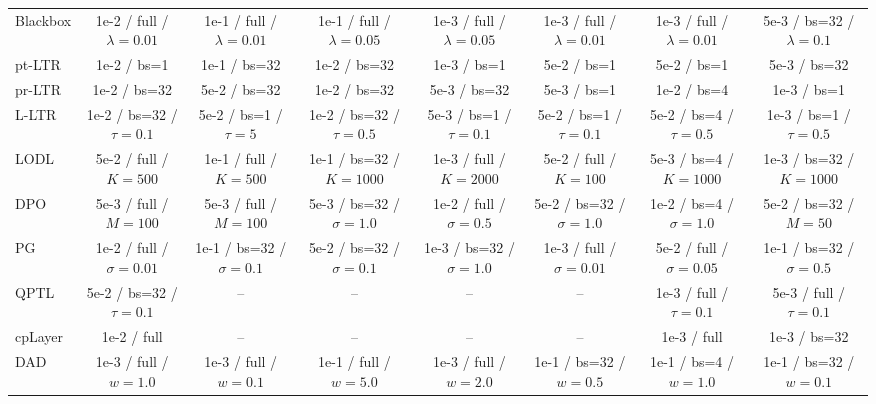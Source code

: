\begin{table}[t]
{\begin{tabular}{@{}lccccccc@{}}
Blackbox & 1e-2 / full / $\lambda{=}0.01$ & 1e-1 / full / $\lambda{=}0.01$ & 1e-1 / full / $\lambda{=}0.05$ & 1e-3 / full / $\lambda{=}0.05$ & 1e-3 / full / $\lambda{=}0.01$ & 1e-3 / full / $\lambda{=}0.01$ & 5e-3 / bs=32 / $\lambda{=}0.1$ \\
pt-LTR & 1e-2 / bs=1 & 1e-1 / bs=32 & 1e-2 / bs=32 & 1e-3 / bs=1 & 5e-2 / bs=1 & 5e-2 / bs=1 & 5e-3 / bs=32 \\
pr-LTR & 1e-2 / bs=32 & 5e-2 / bs=32 & 1e-2 / bs=32 & 5e-3 / bs=32 & 5e-3 / bs=1 & 1e-2 / bs=4 & 1e-3 / bs=1 \\
L-LTR & 1e-2 / bs=32 / $\tau{=}0.1$ & 5e-2 / bs=1 / $\tau{=}5$ & 1e-2 / bs=32 / $\tau{=}0.5$ & 5e-3 / bs=1 / $\tau{=}0.1$ & 5e-2 / bs=1 / $\tau{=}0.1$ & 5e-2 / bs=4 / $\tau{=}0.5$ & 1e-3 / bs=1 / $\tau{=}0.5$ \\
LODL & 5e-2 / full / $K{=}500$ & 1e-1 / full / $K{=}500$ & 1e-1 / bs=32 / $K{=}1000$ & 1e-3 / full / $K{=}2000$ & 5e-2 / full / $K{=}100$ & 5e-3 / bs=4 / $K{=}1000$ & 1e-3 / bs=32 / $K{=}1000$ \\
DPO & 5e-3 / full / $M{=}100$ & 5e-3 / full / $M{=}100$ & 5e-3 / bs=32 / $\sigma{=}1.0$ & 1e-2 / full / $\sigma{=}0.5$ & 5e-2 / bs=32 / $\sigma{=}1.0$ & 1e-2 / bs=4 / $\sigma{=}1.0$ & 5e-2 / bs=32 / $M{=}50$ \\
PG & 1e-2 / full / $\sigma{=}0.01$ & 1e-1 / bs=32 / $\sigma{=}0.1$ & 5e-2 / bs=32 / $\sigma{=}0.1$ & 1e-3 / bs=32 / $\sigma{=}1.0$ & 1e-3 / full / $\sigma{=}0.01$ & 5e-2 / full / $\sigma{=}0.05$ & 1e-1 / bs=32 / $\sigma{=}0.5$ \\
QPTL & 5e-2 / bs=32 / $\tau{=}0.1$ & -- & -- & -- & -- & 1e-3 / full / $\tau{=}0.1$ & 5e-3 / full / $\tau{=}0.1$ \\
cpLayer & 1e-2 / full & -- & -- & -- & -- & 1e-3 / full & 1e-3 / bs=32 \\
DAD & 1e-3 / full / $w{=}1.0$ & 1e-3 / full / $w{=}0.1$ & 1e-1 / full / $w{=}5.0$ & 1e-3 / full / $w{=}2.0$ & 1e-1 / bs=32 / $w{=}0.5$ & 1e-1 / bs=4 / $w{=}1.0$ & 1e-1 / bs=32 / $w{=}0.1$ \\
\bottomrule
\end{tabular}}
\vspace{0.75em}


\end{table}
